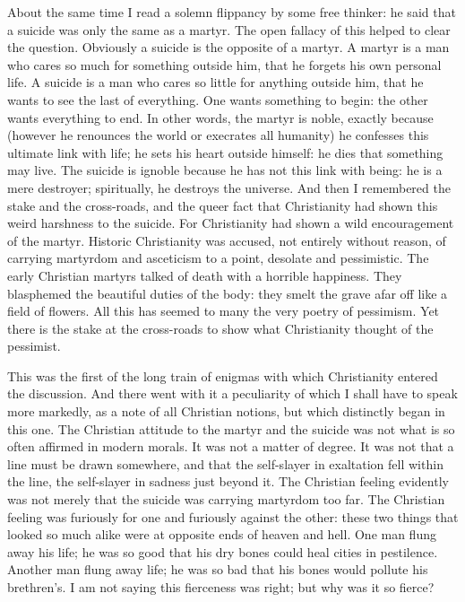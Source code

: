 \documentclass{book}
\begin{document}
About the same time I read a solemn flippancy by some free thinker: he said that a suicide was only the same as a martyr. The open fallacy of this helped to clear the question. Obviously a suicide is the opposite of a martyr. A martyr is a man who cares so much for something outside him, that he forgets his own personal life. A suicide is a man who cares so little for anything outside him, that he wants to see the last of everything. One wants something to begin: the other wants everything to end. In other words, the martyr is noble, exactly because (however he renounces the world or execrates all humanity) he confesses this ultimate link with life; he sets his heart outside himself: he dies that something may live. The suicide is ignoble because he has not this link with being: he is a mere destroyer; spiritually, he destroys the universe. And then I remembered the stake and the cross-roads, and the queer fact that Christianity had shown this weird harshness to the suicide. For Christianity had shown a wild encouragement of the martyr. Historic Christianity was accused, not entirely without reason, of carrying martyrdom and asceticism to a point, desolate and pessimistic. The early Christian martyrs talked of death with a horrible happiness. They blasphemed the beautiful duties of the body: they smelt the grave afar off like a field of flowers. All this has seemed to many the very poetry of pessimism. Yet there is the stake at the cross-roads to show what Christianity thought of the pessimist.

This was the first of the long train of enigmas with which Christianity entered the discussion. And there went with it a peculiarity of which I shall have to speak more markedly, as a note of all Christian notions, but which distinctly began in this one. The Christian attitude to the martyr and the suicide was not what is so often affirmed in modern morals. It was not a matter of degree. It was not that a line must be drawn somewhere, and that the self-slayer in exaltation fell within the line, the self-slayer in sadness just beyond it. The Christian feeling evidently was not merely that the suicide was carrying martyrdom too far. The Christian feeling was furiously for one and furiously against the other: these two things that looked so much alike were at opposite ends of heaven and hell. One man flung away his life; he was so good that his dry bones could heal cities in pestilence. Another man flung away life; he was so bad that his bones would pollute his brethren’s. I am not saying this fierceness was right; but why was it so fierce?
\end{document}
